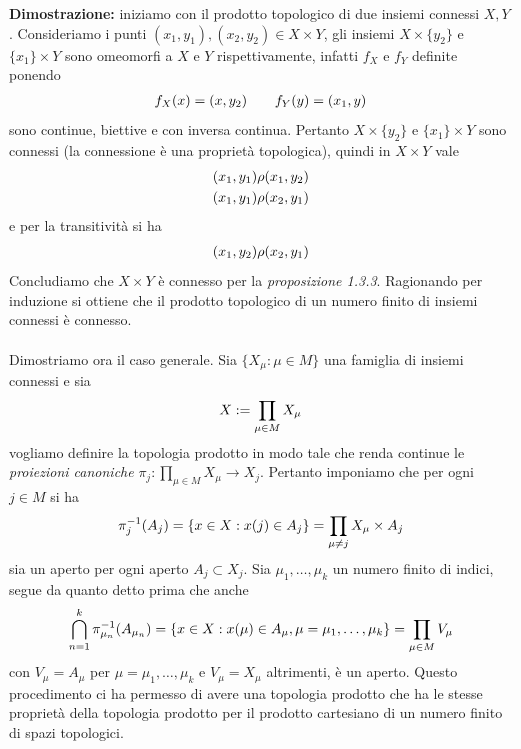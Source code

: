 \documentclass{article}
\begin{document}
\textbf{Dimostrazione:} iniziamo con il prodotto topologico di due insiemi connessi $X, Y$. Consideriamo i punti $(x_1, y_1), (x_2, y_2) \in X \times Y$, gli insiemi $X \times \{ y_2 \}$ e $\{ x_1 \} \times Y$ sono omeomorfi a $X$ e $Y$ rispettivamente, infatti $f_X$ e $f_Y$ definite ponendo
\begin{gather}
    f_X(x) = (x, y_2) \qquad f_Y(y) = (x_1, y) \notag
\end{gather}
sono continue, biettive e con inversa continua. Pertanto $X \times \{ y_2 \}$ e $\{ x_1 \} \times Y$ sono connessi (la connessione è una proprietà topologica), quindi in $X \times Y$ vale
\begin{gather}
    (x_1, y_1) \rho (x_1, y_2) \notag \\
    (x_1, y_1) \rho (x_2, y_1) \notag
\end{gather}
e per la transitività si ha
\begin{gather}
    (x_1, y_2) \rho (x_2, y_1) \notag
\end{gather}
Concludiamo che $X \times Y$ è connesso per la \textit{proposizione 1.3.3}. Ragionando per induzione si ottiene che il prodotto topologico di un numero finito di insiemi connessi è connesso. \\ \\
Dimostriamo ora il caso generale. Sia $\{ X_\mu : \mu \in M \}$ una famiglia di insiemi connessi e sia 
\begin{gather}
    X := \prod_{\mu \in M} X_\mu \notag
\end{gather}
vogliamo definire la topologia prodotto in modo tale che renda continue le \textit{proiezioni canoniche} $\pi_j : \prod_{\mu \in M} X_\mu \longrightarrow X_j$. Pertanto imponiamo che per ogni $j \in M$ si ha
\begin{gather}
    \pi_j^{-1}(A_j) = \{ x \in X : x(j) \in A_j \} = \prod_{\mu \neq j} X_\mu \times A_j \notag
\end{gather}
sia un aperto per ogni aperto $A_j \subset X_j$. Sia $\mu_1, \dots, \mu_k$ un numero finito di indici, segue da quanto detto prima che anche
\begin{gather}
    \bigcap_{n = 1}^k \pi_{\mu_n}^{-1}(A_{\mu_n}) = \{ x \in X : x(\mu) \in A_{\mu}, \mu = \mu_1, \dots, \mu_k \} = \prod_{\mu \in M} V_\mu \notag
\end{gather}
con $V_\mu = A_\mu$ per $\mu = \mu_1, \dots, \mu_k$ e $V_\mu = X_\mu$ altrimenti, è un aperto. Questo procedimento ci ha permesso di avere una topologia prodotto che ha le stesse proprietà della topologia prodotto per il prodotto cartesiano di un numero finito di spazi topologici. \\
\end{document}
